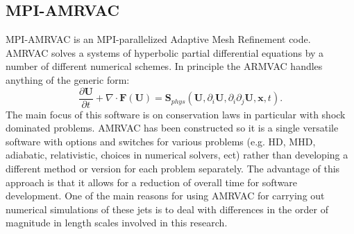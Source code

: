 \documentclass[12pt,a4paper,twoside]{article}
\begin{document}
\subsection{MPI-AMRVAC}
MPI-AMRVAC is an MPI-parallelized Adaptive Mesh Refinement code. AMRVAC solves a systems of hyperbolic partial differential equations by a number of different numerical schemes. In principle the ARMVAC handles anything of the generic form: 
\begin{equation}
\frac{\partial \boldsymbol{U}}{\partial t} + \nabla \cdot \boldsymbol{F}(\boldsymbol{U}) = \boldsymbol{S}_{phys} (\boldsymbol{U}, \partial_{i} \boldsymbol{U}, \partial_i \partial_j \boldsymbol{U},\boldsymbol{x},t) .
\end{equation}
The main focus of this software is on conservation laws in particular with shock dominated problems. AMRVAC has been constructed so it is a single versatile software with options and switches for various problems (e.g. HD, MHD, adiabatic, relativistic, choices in numerical solvers, ect) rather than developing a different method or version for each problem separately. The advantage of this approach is that it allows for a reduction of overall time for software development. One of the main reasons for using AMRVAC for carrying out numerical simulations of these jets is to deal with differences in the order of magnitude in length scales involved in this research.
\end{document}
